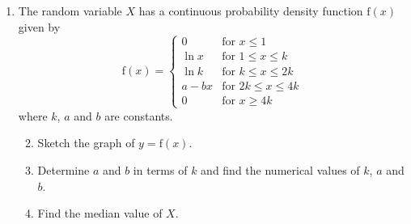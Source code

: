 \documentclass[a4, 11pt]{report}
\newlength{\qspace}
\newcounter{qnumber}
\newenvironment{question}%
 {\vspace{\qspace}
  \begin{enumerate}[\bfseries 1\quad][10]%
    \setcounter{enumi}{\value{qnumber}}%
    \item%
 }
{
  \end{enumerate}
  \filbreak
  \stepcounter{qnumber}
 }
\newenvironment{questionparts}[1][1]%
 {
  \begin{enumerate}[\bfseries (i)]%
    \setcounter{enumii}{#1}
    \addtocounter{enumii}{-1}
    \setlength{\itemsep}{5mm}
    \setlength{\parskip}{8pt}
 }
 {
  \end{enumerate}
 }
\def\f{{\mathrm f}}
\def\le{\leqslant}
\def\ge{\geqslant}
\begin{document}
\begin{question}
The random variable $X$ has a  continuous probability density
function $\f(x)$ given by
\begin{equation*}
\f(x) =
\begin{cases}
0     & \text{for } x \le 1 \\
\ln x & \text{for } 1\le x \le k\\
\ln k & \text{for } k\le x \le 2k\\
a-bx  & \text{for } 2k \le x \le 4k \\
0 & \text{for } x\ge 4k
\end{cases}
\end{equation*}
where $k$, $a$ and $b$ are constants. 
\begin{questionparts}
\item Sketch the graph of $y=\f(x)$.
\item Determine $a$ and  $b$ in terms of $k$ and find the numerical 
values of $k$, $a$ and $b$.
\item Find the median value of $X$.
\end{questionparts}
\end{question}
	
\end{document}
